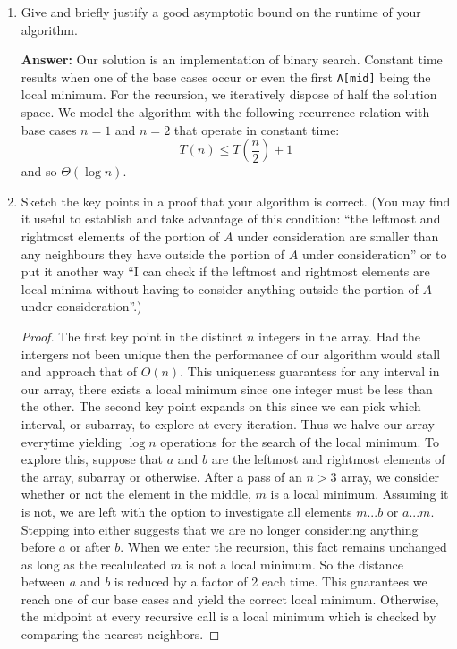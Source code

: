 \documentclass[11pt, oneside]{article}   	%
\theoremstyle{definition}
\theoremstyle{remark}
\begin{document}
\begin{enumerate}
\begin{verbatim}
	\end{verbatim}    
\item Give and briefly justify a good asymptotic bound on the runtime of
   your algorithm. 
   
   \textbf{Answer: }Our solution is an implementation of binary search. Constant time results when one of the base cases occur or even the first \texttt{A[mid]} being the local minimum. For the recursion, we iteratively dispose of half the solution space. We model the algorithm with the following recurrence relation with base cases $n=1$ and $n=2$ that operate in constant time: $$T(n) \leq T(\frac{n}{2}) + 1$$ and so $\Theta (\log n)$.
\item Sketch the key points in a proof that your algorithm is
   correct. (You may find it useful to establish and take advantage of
   this condition: ``the leftmost and rightmost elements of the portion
   of $A$ under consideration are smaller than any neighbours they
   have outside the portion of $A$ under consideration'' or to put it
   another way ``I can check if the leftmost and rightmost elements are
   local minima without having to consider anything outside the
   portion of $A$ under consideration''.)
   
   \begin{proof}
   The first key point in the distinct $n$ integers in the array. Had the intergers not been unique then the performance of our algorithm would stall and approach that of $ O(n)$. This uniqueness guarantess for any interval in our array, there exists a local minimum since one integer must be less than the other. The second key point expands on this since we can pick which interval, or subarray, to explore at every iteration. Thus we halve our array everytime yielding $\log n$ operations for the search of the local minimum. To explore this, suppose that $a$ and $b$ are the leftmost and rightmost elements of the array, subarray or otherwise. After a pass of an $n > 3$ array, we consider whether or not the element in the middle, $m$ is a local minimum. Assuming it is not, we are left with the option to investigate all elements $m...b$ or $a...m$. Stepping into either suggests that we are no longer considering anything before $a$ or after $b$. When we enter the recursion, this fact remains unchanged as long as the recalulcated $m$ is not a local minimum. So the distance between $a$ and $b$ is reduced by a factor of 2 each time. This guarantees we reach one of our base cases and yield the correct local minimum. Otherwise, the midpoint at every recursive call is a local minimum which is checked by comparing the nearest neighbors. 
   \end{proof}
\end{enumerate}
\end{document}
